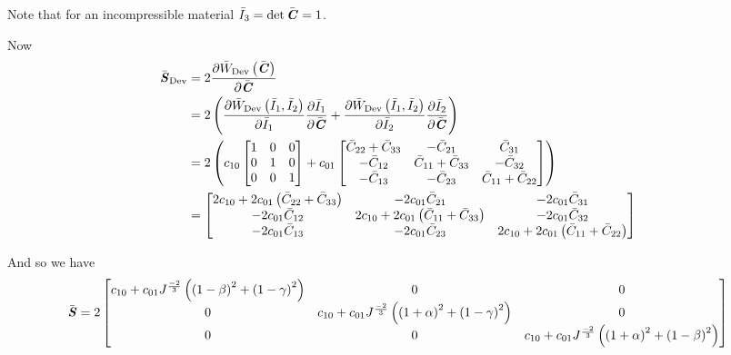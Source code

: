 Note that for an incompressible material $\bar{I}_{3}=\det \bar{\boldsymbol{\mathit{C}}}=1$.

Now
\begin{equation}
  \begin{split}
    \bar{\boldsymbol{\mathit{S}}}_{\operatorname{Dev}}&=2 \dfrac{\partial  \bar{W}_{\operatorname{Dev}}\left( \bar{\boldsymbol{\mathit{C}}} \right) }{\partial \bar{\boldsymbol{\mathit{C}}}}  \\
    &=2\left(  \dfrac{\partial  \bar{W}_{\operatorname{Dev}}\left( \bar{I}_{1},\bar{I}_{2} \right) }{\partial \bar{I}_{1}}  \dfrac{\partial \bar{I}_{1}}{\partial \bar{\boldsymbol{\mathit{C}}}} + \dfrac{\partial  \bar{W}_{\operatorname{Dev}}\left( \bar{I}_{1},\bar{I}_{2} \right) }{\partial \bar{I}_{2}}  \dfrac{\partial \bar{I}_{2}}{\partial \bar{\boldsymbol{\mathit{C}}}}  \right)\\
    &=2\left( c_{10}\begin{bmatrix}
        1 & 0 & 0 \\
        0 & 1 & 0 \\
        0 & 0 & 1
      \end{bmatrix}+c_{01}\begin{bmatrix}
        \bar{C}_{22}+\bar{C}_{33} & -\bar{C}_{21} & \bar{C}_{31} \\
        -\bar{C}_{12} & \bar{C}_{11}+\bar{C}_{33} & -\bar{C}_{32} \\
        -\bar{C}_{13} & -\bar{C}_{23} & \bar{C}_{11}+\bar{C}_{22}
    \end{bmatrix} \right) \\
    &=\begin{bmatrix}
    2c_{10}+2c_{01}\left( \bar{C}_{22}+\bar{C}_{33} \right) & -2c_{01}\bar{C}_{21} & -2c_{01}\bar{C}_{31} \\
    -2c_{01}\bar{C}_{12} & 2c_{10}+2c_{01}\left( \bar{C}_{11}+\bar{C}_{33} \right) & -2c_{01}\bar{C}_{32} \\
    -2c_{01}\bar{C}_{13} & -2c_{01}\bar{C}_{23} & 2c_{10}+2c_{01}\left( \bar{C}_{11}+\bar{C}_{22} \right) 
    \end{bmatrix}
  \end{split}
\end{equation}

And so we have
\begin{equation}
  \bar{\boldsymbol{\mathit{S}}}=2\begin{bmatrix}
  c_{10}+c_{01}J^{\frac{-2}{3}}\left( \left( 1-\beta \right)^{2}+\left( 1-\gamma \right)^{2} \right) & 0 & 0\\
  0 & c_{10}+c_{01}J^{\frac{-2}{3}}\left( \left( 1+\alpha \right)^{2}+\left( 1-\gamma \right)^{2} \right) & 0 \\
  0 & 0 & c_{10}+c_{01}J^{\frac{-2}{3}}\left( \left( 1+\alpha \right)^{2}+\left( 1-\beta \right)^{2} \right) 
  \end{bmatrix} 
\end{equation}

